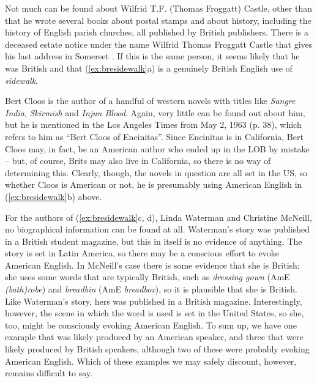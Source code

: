 Not much can be found about Wilfrid T.F. (Thomas Froggatt) Castle, other than that he wrote several books about postal stamps and about history, including the history of English parish churches, all published by British publishers. There is a deceased estate notice under the name Wilfrid Thomas Froggatt Castle that gives his last address in Somerset \citep{the_stationery_office_deceased_1999}. If this is the same person, it seems likely that he was British and that (\ref{ex:bresidewalk}a) is a genuinely British  English use of \textit{sidewalk}.

Bert Cloos is the author of a handful of western novels  with titles like \textit{Sangre India}, \textit{Skirmish} and \textit{Injun Blood}. Again, very little can be found out about him, but he is mentioned in the Los Angeles Times from May 2, 1963 (p. 38), which refers to him as ``Bert Cloos of Encinitas''. Since Encinitas is in California, Bert Cloos may, in fact, be an American  author who ended up in the LOB  by mistake -- but, of course, Brits may also live in California, so there is no way of determining this. Clearly, though, the novels  in question are all set in the US, so whether Cloos is American or not, he is presumably using American English in (\ref{ex:bresidewalk}b) above.

For the authors of (\ref{ex:bresidewalk}c, d), Linda Waterman and Christine McNeill, no biographical information can be found at all. Waterman's story was published in a British student magazine, but this in itself is no evidence of anything. The story is set in Latin America, so there may be a conscious effort to evoke American  English. In McNeill's case there is some evidence that she is British: she uses some words that are typically British,  such as \textit{dressing gown} (AmE \textit{(bath)robe}) and \textit{breadbin} (AmE \textit{breadbox}), so it is plausible that she is British. Like Waterman's story, hers was published in a British magazine. Interestingly, however, the scene in which the word is used is set in the United States, so she, too, might be consciously evoking American  English. To sum up, we have one example that was likely produced by an American speaker, and three that were likely produced by British  speakers, although two of these were probably evoking American English. Which of these examples we may safely discount, however, remains difficult to say.

